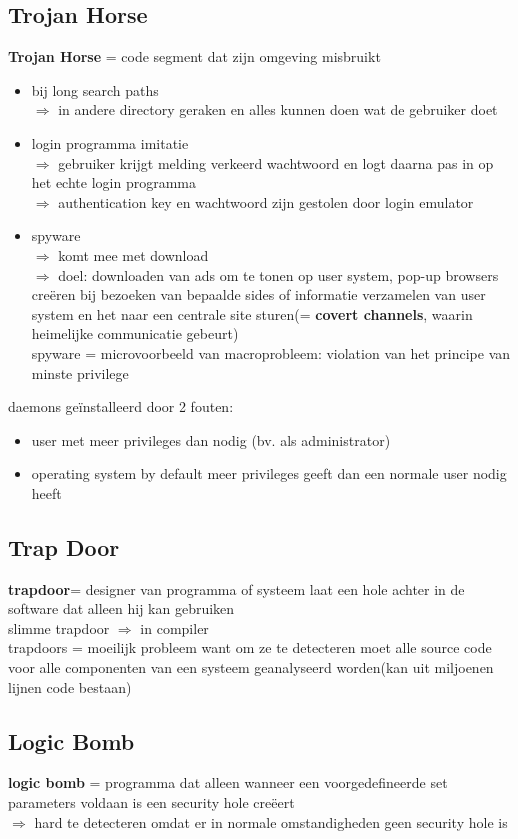\documentclass{report}
\begin{document}
\subsection{Trojan Horse}
\textbf{Trojan Horse} = code segment dat zijn omgeving misbruikt
\begin{itemize}
\item bij long search paths 
\\$\Rightarrow$ in andere directory geraken en alles kunnen doen wat de gebruiker doet
\item login programma imitatie
\\$\Rightarrow$ gebruiker krijgt melding verkeerd wachtwoord en logt daarna pas in op het echte login programma
\\$\Rightarrow$ authentication key en wachtwoord zijn gestolen door login emulator
\item spyware
\\$\Rightarrow$ komt mee met download
\\$\Rightarrow$ doel: downloaden van ads om te tonen op user system, pop-up browsers cre\"eren bij bezoeken van bepaalde sides of informatie verzamelen van user system en het naar een centrale site sturen(= \textbf{covert channels}, waarin heimelijke communicatie gebeurt)
\\spyware = microvoorbeeld van macroprobleem: violation van het principe van minste privilege

\end{itemize}
daemons ge\"installeerd door 2 fouten:
\begin{itemize}
\item user met meer privileges dan nodig (bv. als administrator)
\item operating system by default meer privileges geeft dan een normale user nodig heeft
\end{itemize}
\subsection{Trap Door}
\textbf{trapdoor}= designer van programma of systeem laat een hole achter in de software dat alleen hij kan gebruiken
\\slimme trapdoor $\Rightarrow$ in compiler
\\trapdoors = moeilijk probleem want om ze te detecteren moet alle source code voor alle componenten van een systeem geanalyseerd worden(kan uit miljoenen lijnen code bestaan)

\subsection{Logic Bomb}
\textbf{logic bomb} = programma dat alleen wanneer een voorgedefineerde set parameters voldaan is een security hole cre\"eert
\\$\Rightarrow$ hard te detecteren omdat er in normale omstandigheden geen security hole is
\end{document}

